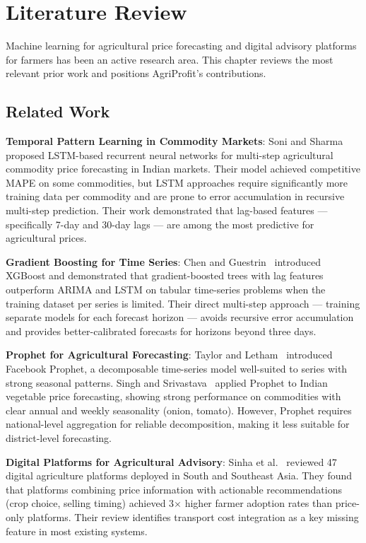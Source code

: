 \documentclass[12pt,a4paper]{report}
\begin{document}
\chapter{Literature Review}

Machine learning for agricultural price forecasting and digital advisory platforms for
farmers has been an active research area. This chapter reviews the most relevant prior work
and positions AgriProfit's contributions.

\section{Related Work}

\textbf{Temporal Pattern Learning in Commodity Markets}: Soni and Sharma~\cite{lstm2020}
proposed LSTM-based recurrent neural networks for multi-step agricultural commodity price
forecasting in Indian markets. Their model achieved competitive MAPE on some commodities,
but LSTM approaches require significantly more training data per commodity and are prone
to error accumulation in recursive multi-step prediction. Their work demonstrated that
lag-based features --- specifically 7-day and 30-day lags --- are among the most predictive
for agricultural prices.

\textbf{Gradient Boosting for Time Series}: Chen and Guestrin~\cite{xgboostseries}
introduced XGBoost and demonstrated that gradient-boosted trees with lag features
outperform ARIMA and LSTM on tabular time-series problems when the training dataset
per series is limited. Their direct multi-step approach --- training separate models for
each forecast horizon --- avoids recursive error accumulation and provides better-calibrated
forecasts for horizons beyond three days.

\textbf{Prophet for Agricultural Forecasting}: Taylor and Letham~\cite{taylor2018forecasting}
introduced Facebook Prophet, a decomposable time-series model well-suited to series with
strong seasonal patterns. Singh and Srivastava~\cite{prophetagri} applied Prophet to Indian
vegetable price forecasting, showing strong performance on commodities with clear annual and
weekly seasonality (onion, tomato). However, Prophet requires national-level aggregation
for reliable decomposition, making it less suitable for district-level forecasting.

\textbf{Digital Platforms for Agricultural Advisory}: Sinha et al.~\cite{digitalagri2021}
reviewed 47 digital agriculture platforms deployed in South and Southeast Asia. They found
that platforms combining price information with actionable recommendations (crop choice,
selling timing) achieved 3$\times$ higher farmer adoption rates than price-only platforms.
Their review identifies transport cost integration as a key missing feature in most existing
systems.
\end{document}

